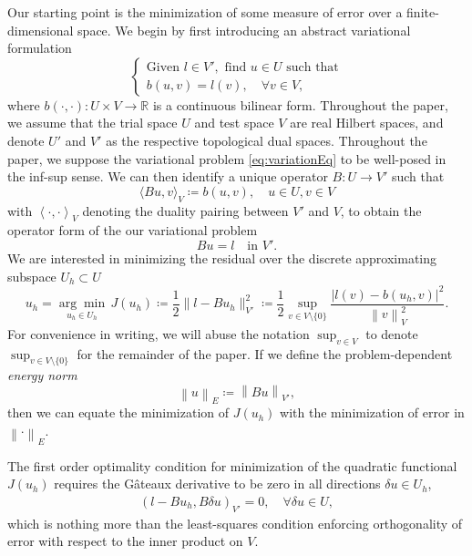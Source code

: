 \documentclass[final,leqno]{siamltex}
\newcommand{\eqnlab}[1]{\label{eq:#1}}
\newcommand{\eqnref}[1]{\eqref{eq:#1}}
\newcommand{\mbb}[1]{\mathbb{#1}}
\newcommand{\nor}[1]{\left\| #1 \right\|}
\newcommand{\LRp}[1]{\left( #1 \right)}
\newcommand{\LRa}[1]{\left\langle #1 \right\rangle}
\begin{document}
Our starting point is the minimization of some measure of error over a finite-dimensional space.  We begin by first introducing an abstract variational formulation 
\begin{equation}
\eqnlab{variationEq}
\left\{
  \begin{array}{l}
    \text{Given } l \in V', \text{ find } u \in U  \text{ such that} \\ 
    b(u,v) = l(v), \quad \forall v\in V,
  \end{array}
  \right.
\end{equation}
where $b\LRp{\cdot,\cdot}: U \times V \to \mbb{R}$ is a continuous bilinear form.  Throughout the paper, we assume that the trial space $U$ and test space $V$ are real Hilbert spaces, and denote $U'$ and $V'$ as the respective topological dual spaces.  Throughout the paper, we suppose the variational problem \eqnref{variationEq} to be well-posed in the inf-sup sense. We can then identify a unique operator $B:U\rightarrow V'$ such that 
\[
\langle Bu,v\rangle_V \coloneqq b(u,v), \quad u\in U, v\in V
\]
with $\LRa{\cdot, \cdot}_V$ denoting the duality pairing between $V'$ and $V$, to obtain the operator form of the our variational problem
\begin{equation}
\eqnlab{dualEq}
Bu = l \quad \text{in } V'.
\end{equation}
We are interested in minimizing the residual over the discrete approximating subspace $U_h \subset U$
\[
u_h = \underset{u_h\in U_h}{\arg\min}\, J(u_h) \coloneqq \frac{1}{2}\|l-Bu_h\|_{V'}^2 \coloneqq\frac{1}{2} \sup_{v\in V\setminus\{0\}} \frac{| l(v)- b(u_h,v)|^2}{\nor{v}_V^2}.
\]
For convenience in writing, we will abuse the notation $\sup_{v \in V}$ to denote $\sup_{v\in V\setminus\{0\}}$ for the remainder of the paper.  If we define the problem-dependent \textit{energy norm} 
\[
\nor{u}_E \coloneqq \nor{Bu}_{V'},
\]
then we can equate the minimization of $J(u_h)$ with the minimization of error in $\nor{\cdot}_E$. 

The first order optimality condition for minimization of the quadratic functional $J(u_h)$ requires the G\^ateaux derivative to be zero in all directions $\delta u \in U_h$,
\begin{align}
\left(l-Bu_h,B\delta u\right)_{V'} = 0, \quad \forall \delta u \in U,
\label{orthog}
\end{align}
which is nothing more than the least-squares condition enforcing orthogonality of error with respect to the inner product on $V$.  
\end{document}
